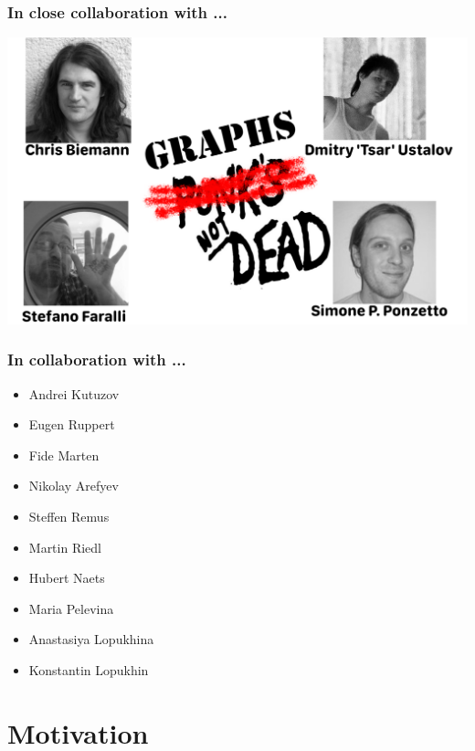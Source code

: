


\begin{frame}
  \frametitle{In close collaboration with ... }

 \includegraphics[width=.95\textwidth]{figures/collaborators}	
\end{frame}



\begin{frame}
  \frametitle{In collaboration with ... }
  { \large \bf
  \begin{itemize}
  	\item Andrei Kutuzov
  	\item Eugen Ruppert
  	\item Fide Marten
  	\item Nikolay Arefyev
  	\item Steffen Remus
  	\item Martin Riedl
  	\item Hubert Naets
   	\item Maria Pelevina
	\item Anastasiya Lopukhina
	\item Konstantin Lopukhin
  
  \end{itemize}	
  }
\end{frame}


\section{Motivation}



